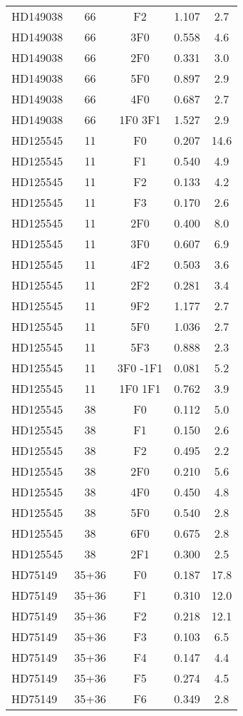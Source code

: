 \begin{table*}
\begin{tabular}{l c c c c}
HD149038 & 66 & F2 & 1.107 & 2.7\\ 
HD149038 & 66 & 3F0 & 0.558 & 4.6\\ 
HD149038 & 66 & 2F0 & 0.331 & 3.0\\ 
HD149038 & 66 & 5F0 & 0.897 & 2.9\\ 
HD149038 & 66 & 4F0 & 0.687 & 2.7\\ 
HD149038 & 66 & 1F0 3F1 & 1.527 & 2.9\\ 
\hline
HD125545 & 11 & F0 & 0.207 & 14.6\\ 
HD125545 & 11 & F1 & 0.540 & 4.9\\ 
HD125545 & 11 & F2 & 0.133 & 4.2\\ 
HD125545 & 11 & F3 & 0.170 & 2.6\\ 
HD125545 & 11 & 2F0 & 0.400 & 8.0\\ 
HD125545 & 11 & 3F0 & 0.607 & 6.9\\ 
HD125545 & 11 & 4F2 & 0.503 & 3.6\\ 
HD125545 & 11 & 2F2 & 0.281 & 3.4\\ 
HD125545 & 11 & 9F2 & 1.177 & 2.7\\ 
HD125545 & 11 & 5F0 & 1.036 & 2.7\\ 
HD125545 & 11 & 5F3 & 0.888 & 2.3\\ 
HD125545 & 11 & 3F0 -1F1 & 0.081 & 5.2\\ 
HD125545 & 11 & 1F0 1F1 & 0.762 & 3.9\\ 
\hline
HD125545 & 38 & F0 & 0.112 & 5.0\\ 
HD125545 & 38 & F1 & 0.150 & 2.6\\ 
HD125545 & 38 & F2 & 0.495 & 2.2\\ 
HD125545 & 38 & 2F0 & 0.210 & 5.6\\ 
HD125545 & 38 & 4F0 & 0.450 & 4.8\\ 
HD125545 & 38 & 5F0 & 0.540 & 2.8\\ 
HD125545 & 38 & 6F0 & 0.675 & 2.8\\ 
HD125545 & 38 & 2F1 & 0.300 & 2.5\\ 
\hline
HD75149 & 35+36 & F0 & 0.187 & 17.8\\ 
HD75149 & 35+36 & F1 & 0.310 & 12.0\\ 
HD75149 & 35+36 & F2 & 0.218 & 12.1\\ 
HD75149 & 35+36 & F3 & 0.103 & 6.5\\ 
HD75149 & 35+36 & F4 & 0.147 & 4.4\\ 
HD75149 & 35+36 & F5 & 0.274 & 4.5\\ 
HD75149 & 35+36 & F6 & 0.349 & 2.8\\ 

\end{tabular}
\end{table*}
